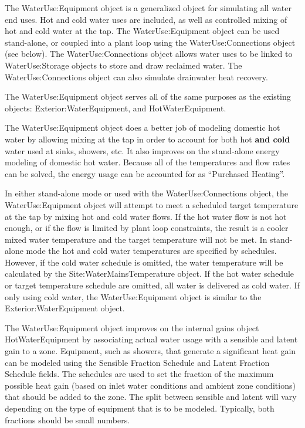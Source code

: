 The WaterUse:Equipment object is a generalized object for simulating all water end uses. Hot and cold water uses are included, as well as controlled mixing of hot and cold water at the tap. The WaterUse:Equipment object can be used stand-alone, or coupled into a plant loop using the WaterUse:Connections object (see below). The WaterUse:Connections object allows water uses to be linked to WaterUse:Storage objects to store and draw reclaimed water. The WaterUse:Connections object can also simulate drainwater heat recovery.

The WaterUse:Equipment object serves all of the same purposes as the existing objects: Exterior:WaterEquipment, and HotWaterEquipment.

The WaterUse:Equipment object does a better job of modeling domestic hot water by allowing mixing at the tap in order to account for both hot \textbf{and cold} water used at sinks, showers, etc. It also improves on the stand-alone energy modeling of domestic hot water. Because all of the temperatures and flow rates can be solved, the energy usage can be accounted for as ``Purchased Heating''.

In either stand-alone mode or used with the WaterUse:Connections object, the WaterUse:Equipment object will attempt to meet a scheduled target temperature at the tap by mixing hot and cold water flows. If the hot water flow is not hot enough, or if the flow is limited by plant loop constraints, the result is a cooler mixed water temperature and the target temperature will not be met. In stand-alone mode the hot and cold water temperatures are specified by schedules. However, if the cold water schedule is omitted, the water temperature will be calculated by the Site:WaterMainsTemperature object. If the hot water schedule or target temperature schedule are omitted, all water is delivered as cold water. If only using cold water, the WaterUse:Equipment object is similar to the Exterior:WaterEquipment object.

The WaterUse:Equipment object improves on the internal gains object HotWaterEquipment by associating actual water usage with a sensible and latent gain to a zone. Equipment, such as showers, that generate a significant heat gain can be modeled using the Sensible Fraction Schedule and Latent Fraction Schedule fields. The schedules are used to set the fraction of the maximum possible heat gain (based on inlet water conditions and ambient zone conditions) that should be added to the zone. The split between sensible and latent will vary depending on the type of equipment that is to be modeled. Typically, both fractions should be small numbers.

